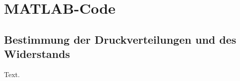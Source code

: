 \chapter{MATLAB-Code}
\label{c:Anhang B}

\section{Bestimmung der Druckverteilungen und des Widerstands}
\label{C_w-Code}
Text.

